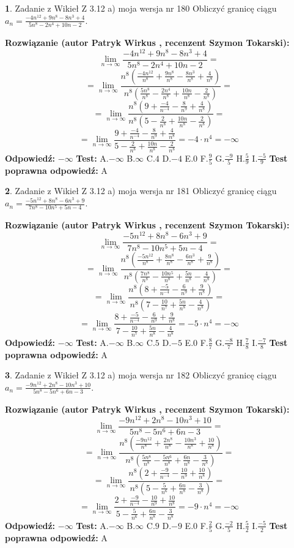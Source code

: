 \documentclass[12pt, a4paper]{article}
\theoremstyle{definition} %
\newtheorem{zad}{}
\newcommand{\zadStart}[1]{\begin{zad}#1\newline}
\newcommand{\zadStop}{\end{zad}}
\newcommand{\rozwStart}[2]{\noindent \textbf{Rozwiązanie (autor #1 , recenzent #2): }\newline}
\newcommand{\rozwStop}{\newline}
\newcommand{\odpStart}{\noindent \textbf{Odpowiedź:}\newline}
\newcommand{\odpStop}{\newline}
\newcommand{\testStart}{\noindent \textbf{Test:}\newline}
\newcommand{\testStop}{\newline}
\newcommand{\kluczStart}{\noindent \textbf{Test poprawna odpowiedź:}\newline}
\newcommand{\kluczStop}{\newline}
\begin{document}
\zadStart{Zadanie z Wikieł Z 3.12 a) moja wersja nr 180}
Obliczyć granicę ciągu $a_{n}=\frac{-4n^{12}+9n^{8}-8n^{3}+4}{5n^{8}-2n^{4}+10n-2}$.
\zadStop
\rozwStart{Patryk Wirkus}{Szymon Tokarski}
$$\lim\limits_{n\to\infty}\frac{-4n^{12}+9n^{8}-8n^{3}+4}{5n^{8}-2n^{4}+10n-2}=$$
$$=\lim\limits_{n\to\infty}\frac{n^{8}\left(\frac{-4n^{12}}{n^{8}}+\frac{9n^{8}}{n^{8}}-\frac{8n^{3}}{n^{8}}+\frac{4}{n^{8}}\right)}{n^{8}\left(\frac{5n^{8}}{n^{8}}-\frac{2n^{4}}{n^{8}}+\frac{10n}{n^{8}}-\frac{2}{n^{8}}\right)}=$$
$$=\lim\limits_{n\to\infty}\frac{n^{8}\left(9+\frac{-4}{n^{-4}}-\frac{8}{n^{9}}+\frac{4}{n^{8}}\right)}
{n^{8}\left(5-\frac{2}{n^{8}}+\frac{10n}{n^{8}}-\frac{2}{n^{8}}\right)}=$$
$$=\lim\limits_{n\to\infty}\frac{9+\frac{-4}{n^{-4}}-\frac{8}{n^{9}}+\frac{4}{n^{8}}}{5-\frac{2}{n^{8}}+\frac{10n}{n^{8}}-\frac{2}{n^{8}}}=-4\cdot n^{4} = -\infty$$
\rozwStop
\odpStart
$-\infty$
\odpStop
\testStart
A.$-\infty$
B.$\infty$
C.$4$
D.$-4$
E.$0$
F.$\frac{9}{5}$
G.$\frac{-9}{5}$
H.$\frac{5}{9}$
I.$\frac{-5}{9}$
\testStop
\kluczStart
A
\kluczStop



\zadStart{Zadanie z Wikieł Z 3.12 a) moja wersja nr 181}
Obliczyć granicę ciągu $a_{n}=\frac{-5n^{12}+8n^{8}-6n^{3}+9}{7n^{8}-10n^{5}+5n-4}$.
\zadStop
\rozwStart{Patryk Wirkus}{Szymon Tokarski}
$$\lim\limits_{n\to\infty}\frac{-5n^{12}+8n^{8}-6n^{3}+9}{7n^{8}-10n^{5}+5n-4}=$$
$$=\lim\limits_{n\to\infty}\frac{n^{8}\left(\frac{-5n^{12}}{n^{8}}+\frac{8n^{8}}{n^{8}}-\frac{6n^{3}}{n^{8}}+\frac{9}{n^{8}}\right)}{n^{8}\left(\frac{7n^{8}}{n^{8}}-\frac{10n^{5}}{n^{8}}+\frac{5n}{n^{8}}-\frac{4}{n^{8}}\right)}=$$
$$=\lim\limits_{n\to\infty}\frac{n^{8}\left(8+\frac{-5}{n^{-4}}-\frac{6}{n^{9}}+\frac{9}{n^{8}}\right)}
{n^{8}\left(7-\frac{10}{n^{7}}+\frac{5n}{n^{8}}-\frac{4}{n^{8}}\right)}=$$
$$=\lim\limits_{n\to\infty}\frac{8+\frac{-5}{n^{-4}}-\frac{6}{n^{9}}+\frac{9}{n^{8}}}{7-\frac{10}{n^{7}}+\frac{5n}{n^{8}}-\frac{4}{n^{8}}}=-5\cdot n^{4} = -\infty$$
\rozwStop
\odpStart
$-\infty$
\odpStop
\testStart
A.$-\infty$
B.$\infty$
C.$5$
D.$-5$
E.$0$
F.$\frac{8}{7}$
G.$\frac{-8}{7}$
H.$\frac{7}{8}$
I.$\frac{-7}{8}$
\testStop
\kluczStart
A
\kluczStop



\zadStart{Zadanie z Wikieł Z 3.12 a) moja wersja nr 182}
Obliczyć granicę ciągu $a_{n}=\frac{-9n^{12}+2n^{8}-10n^{3}+10}{5n^{8}-5n^{6}+6n-3}$.
\zadStop
\rozwStart{Patryk Wirkus}{Szymon Tokarski}
$$\lim\limits_{n\to\infty}\frac{-9n^{12}+2n^{8}-10n^{3}+10}{5n^{8}-5n^{6}+6n-3}=$$
$$=\lim\limits_{n\to\infty}\frac{n^{8}\left(\frac{-9n^{12}}{n^{8}}+\frac{2n^{8}}{n^{8}}-\frac{10n^{3}}{n^{8}}+\frac{10}{n^{8}}\right)}{n^{8}\left(\frac{5n^{8}}{n^{8}}-\frac{5n^{6}}{n^{8}}+\frac{6n}{n^{8}}-\frac{3}{n^{8}}\right)}=$$
$$=\lim\limits_{n\to\infty}\frac{n^{8}\left(2+\frac{-9}{n^{-4}}-\frac{10}{n^{9}}+\frac{10}{n^{8}}\right)}
{n^{8}\left(5-\frac{5}{n^{6}}+\frac{6n}{n^{8}}-\frac{3}{n^{8}}\right)}=$$
$$=\lim\limits_{n\to\infty}\frac{2+\frac{-9}{n^{-4}}-\frac{10}{n^{9}}+\frac{10}{n^{8}}}{5-\frac{5}{n^{6}}+\frac{6n}{n^{8}}-\frac{3}{n^{8}}}=-9\cdot n^{4} = -\infty$$
\rozwStop
\odpStart
$-\infty$
\odpStop
\testStart
A.$-\infty$
B.$\infty$
C.$9$
D.$-9$
E.$0$
F.$\frac{2}{5}$
G.$\frac{-2}{5}$
H.$\frac{5}{2}$
I.$\frac{-5}{2}$
\testStop
\kluczStart
A
\kluczStop
\end{document}
